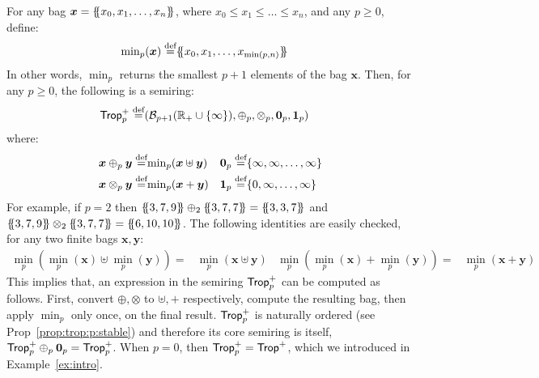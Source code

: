 \begin{ex} \label{ex:trop:p} For any bag
  $\bm x = \{\hspace{-1mm}\{x_0, x_1, \ldots, x_n\}\hspace{-1mm}\}$, where
  $x_0\leq x_1 \leq \ldots \leq x_n$, and any $p \geq 0$, define:
  \begin{align*}
    {\min}_p(\bm x) \stackrel{\text{def}}{=} & \{\hspace{-1mm}\{x_0, x_1, \ldots, x_{\min(p,n)}\}\hspace{-1mm}\}
  \end{align*}
  In other words, $\min_p$ returns the smallest $p+1$ elements of the
  bag $\bm x$.  Then, for any $p \geq 0$, the following is a semiring:
  \begin{align*}
    \text{\sf Trop}^+_p \stackrel{\text{def}}{=} & (\mathcal B_{p+1}(\mathbb R_+\cup\{\infty\}), \oplus_p, \otimes_p, \bm 0_p, \bm 1_p)
  \end{align*}
  where:
  \begin{align*}
    \bm x \oplus_p \bm y \stackrel{\text{def}}{=} & {\min}_p(\bm x \uplus \bm y) &
    \bm 0_p \stackrel{\text{def}}{=} & \{\infty, \infty, \ldots, \infty\} \\
    \bm x \otimes_p \bm y \stackrel{\text{def}}{=} & {\min}_p(\bm x + \bm y) &
    \bm 1_p \stackrel{\text{def}}{=} & \{0,\infty, \ldots, \infty\}
  \end{align*}
  For example, if $p=2$ then
  $\{\hspace{-1mm}\{3,7,9\}\hspace{-1mm}\} \oplus_2 \{\hspace{-1mm}\{3,7,7\}\hspace{-1mm}\} = \{\hspace{-1mm}\{3,3,7\}\hspace{-1mm}\}$ and
  $\{\hspace{-1mm}\{3,7,9\}\hspace{-1mm}\} \otimes_2 \{\hspace{-1mm}\{3,7,7\}\hspace{-1mm}\} = \{\hspace{-1mm}\{6,10,10\}\hspace{-1mm}\}$.
  The following identities are easily checked, for any two finite bags
  $\bm x, \bm y$:
  \begin{align}
    {\min}_p({\min}_p(\bm x) \uplus {\min}_p(\bm y))= & {\min}_p(\bm x \uplus \bm y)&
    {\min}_p({\min}_p(\bm x) + {\min}_p(\bm y))= & {\min}_p(\bm x + \bm y) \label{eq:minp:identity}
  \end{align}
  This implies that, an expression in the semiring $\text{\sf Trop}^+_p$ can be
  computed as follows.  First, convert $\oplus, \otimes$ to
  $\uplus, +$ respectively, compute the resulting bag, then apply
  $\min_p$ only once, on the final result. $\text{\sf Trop}^+_p$ is naturally
  ordered (see Prop~\ref{prop:trop:p:stable}) and therefore its core
  semiring is itself, $\text{\sf Trop}^+_p \oplus_p \bm 0_p = \text{\sf Trop}^+_p$.
%
%
  When $p=0$, then $\text{\sf Trop}^+_p = \text{\sf Trop}^+$, which we introduced in
  Example~\ref{ex:intro}.
\end{ex}

